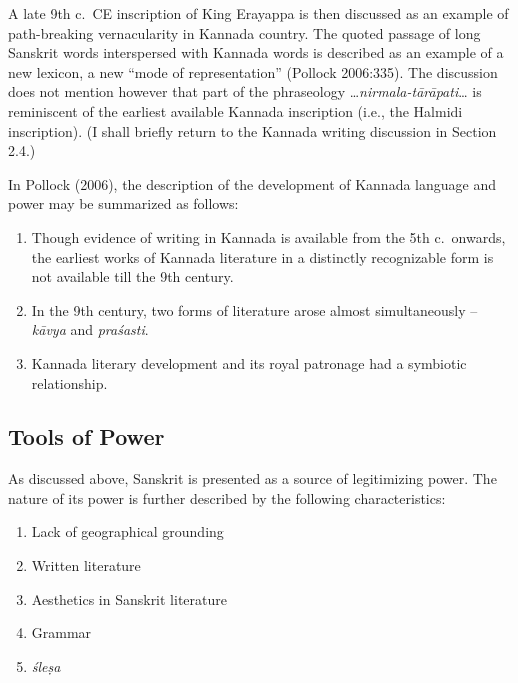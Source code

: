 A late 9th c.\ CE inscription of King Erayappa is then discussed as an example of path-breaking vernacularity in Kannada country. The quoted passage of long Sanskrit words interspersed with Kannada words is described as an example of a new lexicon, a new “mode of representation” (Pollock 2006:335). The discussion does not mention however that part of the phraseology …{\sl nirmala-tārāpati}… is reminiscent of the earliest available Kannada inscription (i.e., the Halmidi inscription). (I shall briefly return to the Kannada writing discussion in Section 2.4.) 

In Pollock (2006), the description of the development of Kannada language and power may be summarized as follows: 
\begin{enumerate}
\itemsep=0pt
\item Though evidence of writing in Kannada is available from the 5th c.\ onwards, the earliest works of Kannada literature in a distinctly recognizable form is not available till the 9th century.
\item In the 9th century, two forms of literature arose almost simultaneously – {\sl kāvya} and {\sl praśasti}.
\item Kannada literary development and its royal patronage had a symbiotic relationship. 
\end{enumerate}

\subsection{Tools of Power}

As discussed above, Sanskrit is presented as a source of legitimizing power. The nature of its power is further described by the following characteristics:
\begin{enumerate}
\itemsep=0pt
\item Lack of geographical grounding
\item Written literature
\item Aesthetics in Sanskrit literature
\item Grammar
\item {\sl śleṣa}
\end{enumerate}

